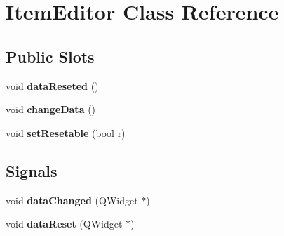 \hypertarget{class_item_editor}{\section{\-Item\-Editor \-Class \-Reference}
\label{class_item_editor}
}
\subsection*{\-Public \-Slots}
\begin{DoxyCompactItemize}
\item 
\hypertarget{class_item_editor_abc8de9a31edf1fa50d486e6e31b2ee78}{void {\bfseries data\-Reseted} ()}\label{class_item_editor_abc8de9a31edf1fa50d486e6e31b2ee78}

\item 
\hypertarget{class_item_editor_add462bed1b1bf732ebe2a1272eea8e4c}{void {\bfseries change\-Data} ()}\label{class_item_editor_add462bed1b1bf732ebe2a1272eea8e4c}

\item 
\hypertarget{class_item_editor_a06a93eb64399ff486cb1372cbc8e566d}{void {\bfseries set\-Resetable} (bool r)}\label{class_item_editor_a06a93eb64399ff486cb1372cbc8e566d}

\end{DoxyCompactItemize}
\subsection*{\-Signals}
\begin{DoxyCompactItemize}
\item 
\hypertarget{class_item_editor_a7a3699c869b93d0a412a01fa116cf9c0}{void {\bfseries data\-Changed} (\-Q\-Widget $\ast$)}\label{class_item_editor_a7a3699c869b93d0a412a01fa116cf9c0}

\item 
\hypertarget{class_item_editor_a8d55b2a3b8df5b90e2bc8f1888ac7e7a}{void {\bfseries data\-Reset} (\-Q\-Widget $\ast$)}\label{class_item_editor_a8d55b2a3b8df5b90e2bc8f1888ac7e7a}

\end{DoxyCompactItemize}
